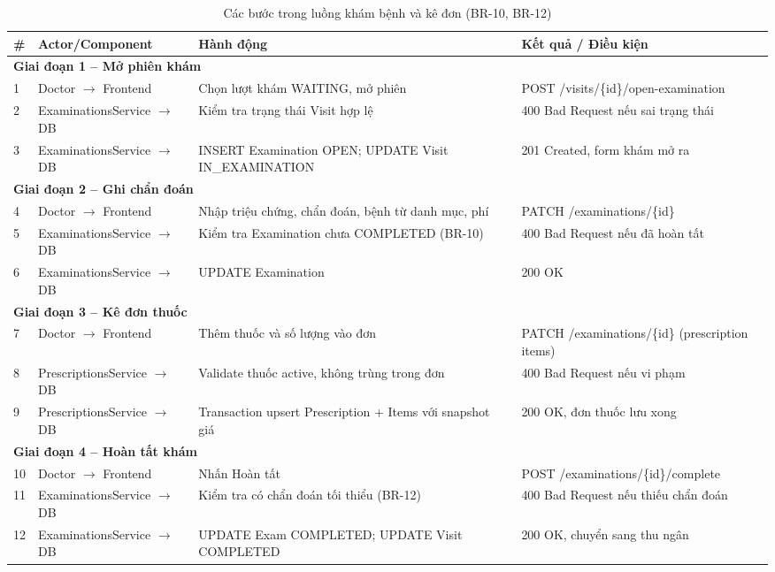 \begin{longtable}{|p{0.5cm}|p{3cm}|p{5cm}|p{5.2cm}|}
\caption{Các bước trong luồng khám bệnh và kê đơn (BR-10, BR-12)}\label{tab:examination-sequence}\\
\hline
\textbf{\#} & \textbf{Actor/Component} & \textbf{Hành động} & \textbf{Kết quả / Điều kiện} \\
\hline
\multicolumn{4}{|l|}{\textbf{Giai đoạn 1 -- Mở phiên khám}} \\
\hline
1 & Doctor $\rightarrow$ Frontend & Chọn lượt khám WAITING, mở phiên & POST /visits/\{id\}/open-examination \\
\hline
2 & ExaminationsService $\rightarrow$ DB & Kiểm tra trạng thái Visit hợp lệ & 400 Bad Request nếu sai trạng thái \\
\hline
3 & ExaminationsService $\rightarrow$ DB & INSERT Examination OPEN; UPDATE Visit IN\_EXAMINATION & 201 Created, form khám mở ra \\
\hline
\multicolumn{4}{|l|}{\textbf{Giai đoạn 2 -- Ghi chẩn đoán}} \\
\hline
4 & Doctor $\rightarrow$ Frontend & Nhập triệu chứng, chẩn đoán, bệnh từ danh mục, phí & PATCH /examinations/\{id\} \\
\hline
5 & ExaminationsService $\rightarrow$ DB & Kiểm tra Examination chưa COMPLETED (BR-10) & 400 Bad Request nếu đã hoàn tất \\
\hline
6 & ExaminationsService $\rightarrow$ DB & UPDATE Examination & 200 OK \\
\hline
\multicolumn{4}{|l|}{\textbf{Giai đoạn 3 -- Kê đơn thuốc}} \\
\hline
7 & Doctor $\rightarrow$ Frontend & Thêm thuốc và số lượng vào đơn & PATCH /examinations/\{id\} (prescription items) \\
\hline
8 & PrescriptionsService $\rightarrow$ DB & Validate thuốc active, không trùng trong đơn & 400 Bad Request nếu vi phạm \\
\hline
9 & PrescriptionsService $\rightarrow$ DB & Transaction upsert Prescription + Items với snapshot giá & 200 OK, đơn thuốc lưu xong \\
\hline
\multicolumn{4}{|l|}{\textbf{Giai đoạn 4 -- Hoàn tất khám}} \\
\hline
10 & Doctor $\rightarrow$ Frontend & Nhấn Hoàn tất & POST /examinations/\{id\}/complete \\
\hline
11 & ExaminationsService $\rightarrow$ DB & Kiểm tra có chẩn đoán tối thiểu (BR-12) & 400 Bad Request nếu thiếu chẩn đoán \\
\hline
12 & ExaminationsService $\rightarrow$ DB & UPDATE Exam COMPLETED; UPDATE Visit COMPLETED & 200 OK, chuyển sang thu ngân \\
\hline
\end{longtable}

